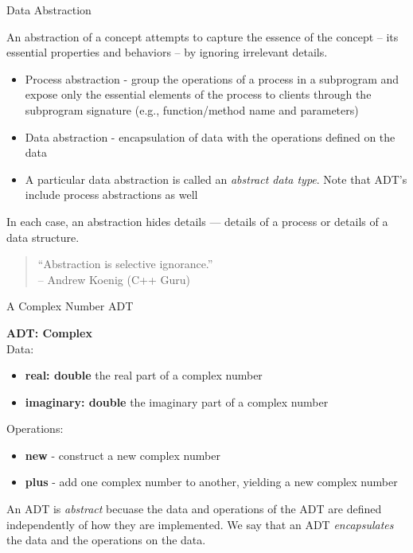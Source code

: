 \documentclass{beamer}
\author[Chris Simpkins] 
{Christopher Simpkins \\\texttt{chris.simpkins@gatech.edu}}
\institute[Georgia Tech] %
\date{}
\begin{document}
\begin{frame}
  \titlepage
\end{frame}


\begin{frame}{Data Abstraction}


An abstraction of a concept attempts to capture the essence of the concept -- its essential properties and behaviors -- by ignoring irrelevant details.
\begin{itemize}
\item Process abstraction - group the operations of a process in a subprogram and expose only the essential elements of the process to clients through the subprogram signature (e.g., function/method name and parameters)
\item Data abstraction - encapsulation of data with the operations defined on the data
\item A particular data abstraction is called an {\em abstract data type}.  Note that ADT's include process abstractions as well
\end{itemize}

In each case, an abstraction hides details --- details of a process or details of a data structure.  

\begin{quote}
``Abstraction is selective ignorance.''\\
-- Andrew Koenig (C++ Guru) 
\end{quote}
\end{frame}

\begin{frame}[fragile]{A Complex Number ADT}


{\bf ADT: Complex}\\
Data:
\begin{itemize}
\item {\bf real: double} the real part of a complex number
\item {\bf imaginary: double} the imaginary part of a complex number
\end{itemize}
Operations:
\begin{itemize}
\item {\bf new} - construct a new complex number
\item {\bf plus} - add one complex number to another, yielding a new complex number
\end{itemize}
An ADT is {\it abstract} becuase the data and operations of the ADT are defined independently of how they are implemented.  We say that an ADT {\it encapsulates} the data and the operations on the data.

\end{frame}
\end{document}
